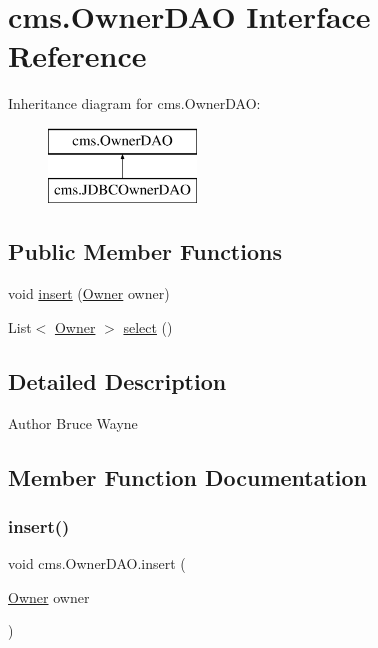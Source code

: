 \hypertarget{interfacecms_1_1_owner_d_a_o}{}\section{cms.\+Owner\+D\+AO Interface Reference}
\label{interfacecms_1_1_owner_d_a_o}
Inheritance diagram for cms.\+Owner\+D\+AO\+:\begin{figure}[H]
\begin{center}
\leavevmode
\includegraphics[height=2.000000cm]{interfacecms_1_1_owner_d_a_o}
\end{center}
\end{figure}
\subsection*{Public Member Functions}
\begin{DoxyCompactItemize}
\item 
void \mbox{\hyperlink{interfacecms_1_1_owner_d_a_o_ad8e659635fa64791942d5377077bedfd}{insert}} (\mbox{\hyperlink{classcms_1_1_owner}{Owner}} owner)
\item 
List$<$ \mbox{\hyperlink{classcms_1_1_owner}{Owner}} $>$ \mbox{\hyperlink{interfacecms_1_1_owner_d_a_o_a51c6035e79a08ba4bf4396175e841133}{select}} ()
\end{DoxyCompactItemize}


\subsection{Detailed Description}
\begin{DoxyAuthor}{Author}
Bruce Wayne 
\end{DoxyAuthor}


\subsection{Member Function Documentation}
\mbox{\label{interfacecms_1_1_owner_d_a_o_ad8e659635fa64791942d5377077bedfd}} 
\subsubsection{\texorpdfstring{insert()}{insert()}}
{\footnotesize\ttfamily void cms.\+Owner\+D\+A\+O.\+insert (\begin{DoxyParamCaption}\item[{\mbox{\hyperlink{classcms_1_1_owner}{Owner}}}]{owner }\end{DoxyParamCaption})}



